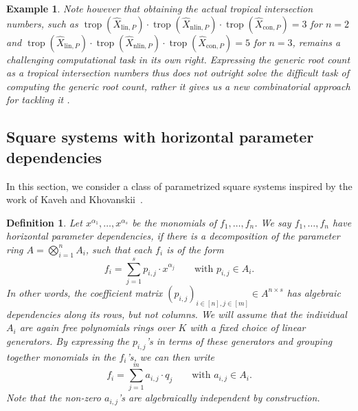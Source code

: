 \documentclass[12pt,reqno,a4paper]{amsart}
\theoremstyle{theoremstyle}
\theoremstyle{examplestyle}
\newtheorem{example}[theorem]{Example}
\newtheorem{definition}[theorem]{Definition}
\theoremstyle{algorithmstyle}
\DeclareMathOperator{\trop}{trop}
\begin{document}
\begin{example}
  Note however that obtaining the actual tropical intersection numbers, such as $\trop(\widehat{X}_{\mathrm{lin},P})\cdot \trop(\widehat{X}_{\mathrm{nlin},P})\cdot \trop(\widehat{X}_{\mathrm{con},P})=3$ for $n=2$ and $\trop(\widehat{X}_{\mathrm{lin},P})\cdot \trop(\widehat{X}_{\mathrm{nlin},P})\cdot \trop(\widehat{X}_{\mathrm{con},P})=5$ for $n=3$, remains a challenging computational task in its own right.  Expressing the generic root count as a tropical intersection numbers thus does not outright solve the difficult task of computing the generic root count, rather it gives us a new combinatorial approach for tackling it %
  \cite{HelminckHenrikssonRen2024}.
\end{example}


\subsection{Square systems with horizontal parameter dependencies}\label{sec:horizontalDependencies}
In this section, we consider a class of parametrized square systems inspired by the work of Kaveh and Khovanskii~\cite{KavehKhovanskii2012}.

\begin{definition}\label{def:horizontalDependencies}
  Let $x^{\alpha_1},\dots,x^{\alpha_s}$ be the monomials of $f_1,\dots,f_n$.
  We say $f_1,\dots,f_n$ have \emph{horizontal parameter dependencies}, if there is a decomposition of the parameter ring $A=\bigotimes_{i=1}^{n} A_{i}$, such that each $f_i$ is of the form
  \[ f_i=\sum_{j=1}^s p_{i,j}\cdot x^{\alpha_j} \qquad \text{with } p_{i,j}\in A_{i}. \]
  In other words, the coefficient matrix $(p_{i,j})_{i\in[n],j\in[m]}\in A^{n\times s}$ has algebraic dependencies along its rows, but not columns. We will assume that the individual $A_{i}$ are again free polynomials rings over $K$ with a fixed choice of linear generators. %
  By expressing the $p_{i,j}$'s in terms of these generators and grouping together monomials in the $f_{i}$'s, we can then write %
\begin{equation}\label{eq:HorizontalDependenciesEquation} f_i=\sum_{j=1}^m a_{i,j}\cdot q_{j} \qquad \text{with } a_{i,j}\in A_{i}.
  \end{equation}
  Note that the non-zero $a_{i,j}$'s are algebraically independent by construction.
\end{definition}
\end{document}
